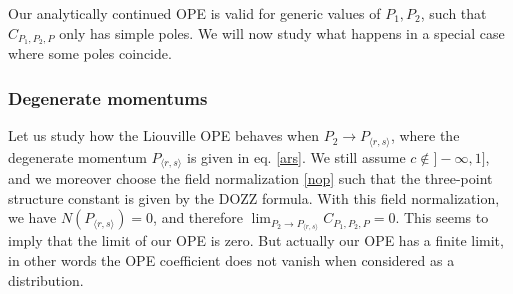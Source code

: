 \documentclass[12pt, a4paper, notitlepage, twoside]{report}
\numberwithin{equation}{section}
\theoremstyle{break}
\begin{document}
Our analytically continued OPE is valid for generic values of $P_1,P_2$, such that $C_{P_1,P_2,P}$ only has simple poles.
We will now study what happens in a special case where some poles coincide.


\subsubsection{Degenerate momentums}

Let us study how the Liouville OPE behaves when $P_2 \to P_{\langle r,s\rangle}$, where the degenerate momentum $P_{\langle r,s \rangle}$ is given in eq. \eqref{ars}.
We still assume $c\notin ]-\infty,1]$, and we moreover choose the field normalization \eqref{nop} such that the three-point structure constant is given by the DOZZ formula. 
With this field normalization, we have $N(P_{\langle r,s\rangle})=0$, and therefore $\lim_{P_2 \to P_{\langle r,s\rangle}} C_{P_1,P_2,P}=0$.
This seems to imply that the limit of our OPE is zero. But actually our OPE has a finite limit, in other words the OPE coefficient does not vanish when considered as a distribution. 
\end{document}
